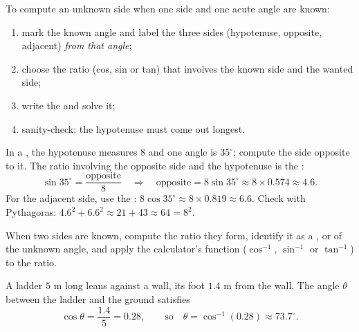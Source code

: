 \begin{method}\label{met:g9:trig:side}
To compute an unknown side when one side and one acute angle are known:
\begin{enumerate}
  \item mark the known angle and label the three sides (hypotenuse,
        opposite, adjacent) \emph{from that angle};
  \item choose the ratio (cos, sin or tan) that involves the known side
        and the wanted side;
  \item write the  and solve it;
  \item sanity-check: the hypotenuse must come out longest.
\end{enumerate}
\end{method}

\begin{example}\label{ex:g9:trig:side}
In a , the hypotenuse measures $8$ and one angle is
$35^\circ$; compute the side opposite to it. The ratio involving the
opposite side and the hypotenuse is the :
\[
\sin 35^\circ = \frac{\text{opposite}}{8}
\quad\Longrightarrow\quad
\text{opposite} = 8 \sin 35^\circ \approx 8 \times 0.574 \approx 4.6 .
\]
For the adjacent side, use the :
$8\cos 35^\circ \approx 8 \times 0.819 \approx 6.6$. Check with
Pythagoras: $4.6^2 + 6.6^2 \approx 21 + 43 \approx 64 = 8^2$.
\end{example}

\begin{method}\label{met:g9:trig:angle}
When two sides are known, compute the ratio they form, identify it as a
,  or  of the unknown angle, and apply the calculator's
 function ($\cos^{-1}$, $\sin^{-1}$ or $\tan^{-1}$) to the ratio.
\end{method}

\begin{example}\label{ex:g9:trig:angle}
A ladder $5$ m long leans against a wall, its foot $1.4$ m from the
wall. The angle $\theta$ between the ladder and the ground satisfies
\[
\cos\theta = \frac{1.4}{5} = 0.28,
\qquad\text{so}\quad
\theta = \cos^{-1}(0.28) \approx 73.7^\circ .
\]
\end{example}


